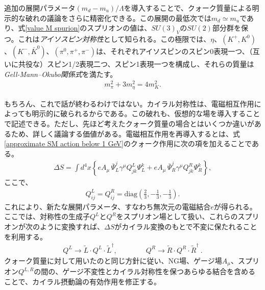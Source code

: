 追加の展開パラメータ$(m_d - m_u)/\Lambda$を導入することで、クォーク質量による明示的な破れの議論をさらに精密化できる。この展開の最低次では$m_d \simeq m_u$であり、式\eqref{value M spurion}のスプリオンの値は、$SU(3)_V$の$SU(2)$部分群を保つ。これは\emph{アイソスピン対称性}として知られる。この極限では、$\eta$、$(K^+, K^0)$、$(K^-, \bar K^0)$、$(\pi^0, \pi^+,\pi^-)$は、それぞれアイソスピンのスピン0表現一つ、（互いに共役な）スピン1/2表現二つ、スピン1表現一つを構成し、それらの質量は\emph{Gell-Mann--Okubo関係式}を満たす。
%
\begin{align}
	m_\pi^2 + 3 m^2_\eta = 4 m^2_K.
\end{align}
%

もちろん、これで話が終わるわけではない。カイラル対称性は、電磁相互作用によっても明示的に破られるからである。この破れも、仮想的な場を導入することで記述できる。ただし、先ほど考えたクォーク質量の場合とはいくつか違いがあるため、詳しく議論する価値がある。電磁相互作用を再導入するとは、式\eqref{approximate SM action below 1 GeV}のクォーク作用に次の項を加えることである。
%
\begin{align}
	\Delta S = \int d^4 x \left\{ e A_\mu \, \bar \Psi_L^j \gamma^\mu Q^L_{jk} \Psi^k_L +  e A_\mu \, \bar \Psi_R^j \gamma^\mu Q^R_{jk} \Psi^k_R \right\} ,
\end{align}
%
ここで、%
\begin{align}
	Q_{ij}^L = Q_{ij}^R = \text{diag} \left(\tfrac{2}{3}, - \tfrac{1}{3}, - \tfrac{1}{3} \right) . 
\end{align}
%
これにより、新たな展開パラメータ、すなわち無次元の電磁結合$e$が得られる。ここでは、対称性の生成子$Q^L$と$Q^R$をスプリオン場として扱い、これらのスプリオンが次のように変換すれば、$\Delta S$がカイラル変換のもとで不変に保たれることを利用する。
%
\begin{align} \label{QL QR defs}
	Q^L \to \tilde L \cdot Q^L \cdot \tilde L^\dag , \qquad \qquad Q^R \to \tilde R \cdot Q^R \cdot  \tilde R^\dag \ .   
\end{align}
%
クォーク質量に対して用いたのと同じ方針に従い、NG場、ゲージ場$A_\mu$、スプリオン$Q^{L,R}$の間の、ゲージ不変性とカイラル対称性を保つあらゆる結合を含めることで、カイラル摂動論の有効作用を修正する。

